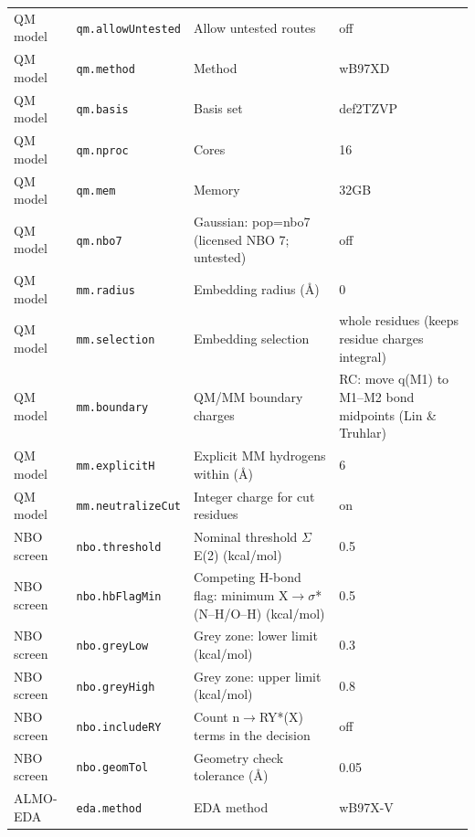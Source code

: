 \documentclass[journal=jcisd8,manuscript=suppinfo]{achemso}
\begin{document}
\begin{singlespace}
{\begin{longtable}{llp{4.2cm}l}
QM model & \texttt{qm.allowUntested} & Allow untested routes & \parbox[t]{5.0cm}{\raggedright off}\\
QM model & \texttt{qm.method} & Method & \parbox[t]{5.0cm}{\raggedright wB97XD}\\
QM model & \texttt{qm.basis} & Basis set & \parbox[t]{5.0cm}{\raggedright def2TZVP}\\
QM model & \texttt{qm.nproc} & Cores & \parbox[t]{5.0cm}{\raggedright 16}\\
QM model & \texttt{qm.mem} & Memory & \parbox[t]{5.0cm}{\raggedright 32GB}\\
QM model & \texttt{qm.nbo7} & Gaussian: pop=nbo7 (licensed NBO 7; untested) & \parbox[t]{5.0cm}{\raggedright off}\\
QM model & \texttt{mm.radius} & Embedding radius (\AA{}) & \parbox[t]{5.0cm}{\raggedright 0}\\
QM model & \texttt{mm.selection} & Embedding selection & \parbox[t]{5.0cm}{\raggedright whole residues (keeps residue charges integral)}\\
QM model & \texttt{mm.boundary} & QM/MM boundary charges & \parbox[t]{5.0cm}{\raggedright RC: move q(M1) to M1--M2 bond midpoints (Lin \& Truhlar)}\\
QM model & \texttt{mm.explicitH} & Explicit MM hydrogens within (\AA{}) & \parbox[t]{5.0cm}{\raggedright 6}\\
QM model & \texttt{mm.neutralizeCut} & Integer charge for cut residues & \parbox[t]{5.0cm}{\raggedright on}\\
NBO screen & \texttt{nbo.threshold} & Nominal threshold $\Sigma$E(2) (kcal/mol) & \parbox[t]{5.0cm}{\raggedright 0.5}\\
NBO screen & \texttt{nbo.hbFlagMin} & Competing H-bond flag: minimum X$\to\sigma$*(N--H/O--H) (kcal/mol) & \parbox[t]{5.0cm}{\raggedright 0.5}\\
NBO screen & \texttt{nbo.greyLow} & Grey zone: lower limit (kcal/mol) & \parbox[t]{5.0cm}{\raggedright 0.3}\\
NBO screen & \texttt{nbo.greyHigh} & Grey zone: upper limit (kcal/mol) & \parbox[t]{5.0cm}{\raggedright 0.8}\\
NBO screen & \texttt{nbo.includeRY} & Count n$\to$RY*(X) terms in the decision & \parbox[t]{5.0cm}{\raggedright off}\\
NBO screen & \texttt{nbo.geomTol} & Geometry check tolerance (\AA{}) & \parbox[t]{5.0cm}{\raggedright 0.05}\\
ALMO-EDA & \texttt{eda.method} & EDA method & \parbox[t]{5.0cm}{\raggedright wB97X-V}\\

\end{longtable}}
\end{singlespace}
\end{document}

